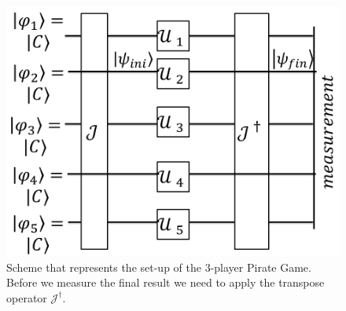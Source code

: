 \begin{figure}[h]
\centering 
\includegraphics[scale=0.35]{Figures/architecture/esquema/esquema.png}
\caption{Scheme that represents the set-up of the $3$-player Pirate Game. Before we measure the final result we need to apply the transpose operator $\mathcal{J}^{\dagger}$. }
\label{fig:pg_architecture3players}
\end{figure}



